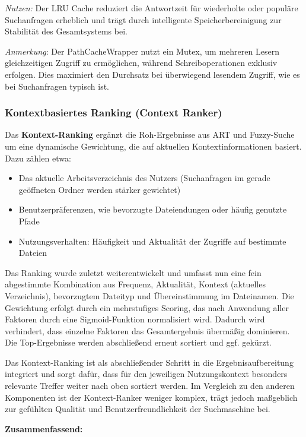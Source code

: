 \textit{Nutzen:} Der LRU Cache reduziert die Antwortzeit für wiederholte oder populäre Suchanfragen erheblich und trägt durch
intelligente Speicherbereinigung zur Stabilität des Gesamtsystems bei.

\textit{Anmerkung}: Der PathCacheWrapper nutzt ein Mutex, um mehreren Lesern gleichzeitigen Zugriff zu ermöglichen, während
Schreiboperationen exklusiv erfolgen. Dies maximiert den Durchsatz bei überwiegend lesendem Zugriff, wie es bei Suchanfragen
typisch ist.

\subsubsection{Kontextbasiertes Ranking (Context Ranker)} 
Das \textbf{Kontext-Ranking} ergänzt die Roh-Ergebnisse aus ART und
Fuzzy-Suche um eine dynamische Gewichtung, die auf aktuellen Kontextinformationen basiert. Dazu zählen etwa:

\begin{itemize}
  \item Das aktuelle Arbeitsverzeichnis des Nutzers (Suchanfragen im gerade geöffneten Ordner werden stärker gewichtet)

	\item Benutzerpräferenzen, wie bevorzugte Dateiendungen oder häufig genutzte Pfade

	\item Nutzungsverhalten: Häufigkeit und Aktualität der Zugriffe auf bestimmte Dateien
\end{itemize}

Das Ranking wurde zuletzt weiterentwickelt und umfasst nun eine fein abgestimmte Kombination aus Frequenz, Aktualität, Kontext
(aktuelles Verzeichnis), bevorzugtem Dateityp und Übereinstimmung im Dateinamen. Die Gewichtung erfolgt durch ein mehrstufiges
Scoring, das nach Anwendung aller Faktoren durch eine Sigmoid-Funktion normalisiert wird. Dadurch wird verhindert, dass einzelne
Faktoren das Gesamtergebnis übermäßig dominieren. Die Top-Ergebnisse werden abschließend erneut sortiert und ggf. gekürzt.

Das Kontext-Ranking ist als abschließender Schritt in die Ergebnisaufbereitung integriert und sorgt dafür, dass für den jeweiligen
Nutzungskontext besonders relevante Treffer weiter nach oben sortiert werden. Im Vergleich zu den anderen Komponenten ist der
Kontext-Ranker weniger komplex, trägt jedoch maßgeblich zur gefühlten Qualität und Benutzerfreundlichkeit der Suchmaschine bei.

\vspace{0.5em}
\noindent
\textbf{Zusammenfassend:} 

